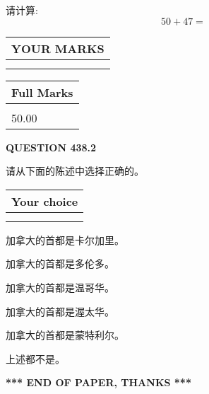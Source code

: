\documentclass{ctexart}
\begin{document}
  
 
请计算:
\begin{equation}
50 +  %
47 = \nonumber
\end{equation}
 

 

 
  
\vspace{0.2in}
  
\noindent\begin{tabular}{|l|}
\hline
 YOUR MARKS  \\
\hline
 \\ 
 \\ 
\hline
\end{tabular}
\hspace{0.05in} \begin{tabular}{|l|}
\hline
 Full Marks  \\
\hline
 \\ 
50.00 \\
\hline
\end{tabular}
{\textbf{\Large{QUESTION
438.2 
}}}
  
  
请从下面的陈述中选择正确的。
  
  
\noindent\hspace{3.0in} \begin{tabular}{|l|}
\hline
Your choice \\
\hline
 \\ 
 \\ 
\hline
\end{tabular}
  
  
 
 
加拿大的首都是卡尔加里。
 
 
加拿大的首都是多伦多。
 
 
加拿大的首都是温哥华。
 
 
加拿大的首都是渥太华。
 
 
加拿大的首都是蒙特利尔。
 
 
 上述都不是。
 
 
   
   
 \vspace{0.2in}
 
   
   
   
   
\vspace{1.0in} 
{\textbf{\large{ *** END OF PAPER, THANKS *** }}} 
   
\end{document}
